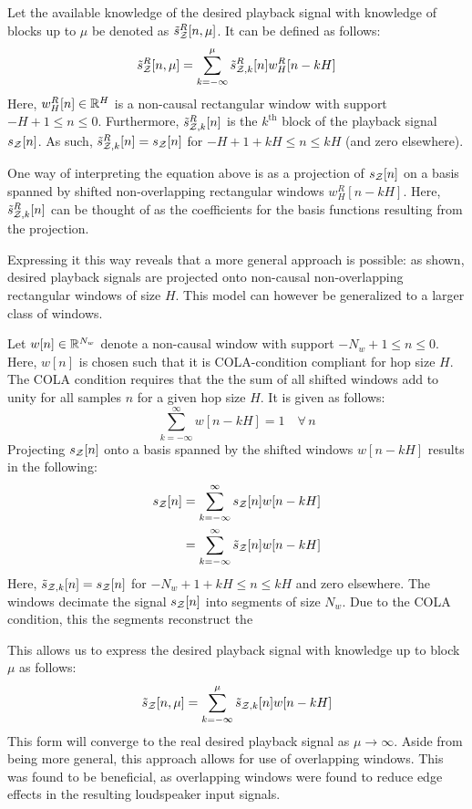 Let the available knowledge of the desired playback signal with knowledge of blocks up to $\mu$ be denoted as $\tilde{s}^R_{\mathcal{Z}}[n, \mu]$.
It can be defined as follows:
\begin{align}
    \tilde{s}^R_{\mathcal{Z}}[n, \mu] = \sum_{k=-\infty}^{\mu} \tilde{s}^R_{\mathcal{Z},k}[n]w^R_H[n - kH]
\end{align}
Here, $w^R_H[n]\in\mathbb{R}^{H}$ is a non-causal rectangular window with support $-H + 1 \leq n \leq 0$. 
Furthermore, $\tilde{s}^R_{\mathcal{Z},k}[n]$ is the $k^\text{th}$ block of the playback signal $s_{\mathcal{Z}}[n]$.
As such, $\tilde{s}^R_{\mathcal{Z},k}[n] = s_{\mathcal{Z}}[n]$ for $-H + 1 + kH \leq n \leq kH$ (and zero elsewhere).  

One way of interpreting the equation above is as a projection of $s_{\mathcal{Z}}[n]$ on a 
basis spanned by shifted non-overlapping rectangular windows $w^R_H[n - kH]$.
Here, $\tilde{s}^R_{\mathcal{Z},k}[n]$ can be thought of as the coefficients for the basis functions resulting from the projection.

Expressing it this way reveals that a more general approach is possible:
as shown, desired playback signals are projected onto non-causal non-overlapping rectangular windows of size $H$.
This model can however be generalized to a larger class of windows.

Let $w[n]\in\mathbb{R}^{N_w}$ denote a non-causal window with support $-N_w + 1 \leq n \leq 0$.
Here, $w[n]$ is chosen such that it is COLA-condition compliant for hop size $H$.
The COLA condition requires that the the sum of all shifted windows add to unity for all samples $n$ for a given hop size $H$. 
It is given as follows:
\begin{equation}
     \sum_{k=-\infty}^{\infty} w[n - kH] = 1 \quad\forall\,n
\end{equation}
Projecting $s_{\mathcal{Z}}[n]$ onto a basis spanned by the shifted windows $w[n - kH]$ results in the following:
\begin{align}
    s_{\mathcal{Z}}[n] &= \sum_{k=-\infty}^{\infty} s_{\mathcal{Z}}[n]w[n - kH] \\
             &= \sum_{k=-\infty}^{\infty} \tilde{s}_{\mathcal{Z}}[n]w[n - kH]
\end{align}
Here, $\tilde{s}_{\mathcal{Z},k}[n] = s_{\mathcal{Z}}[n]$ for $-N_w + 1 + kH \leq n \leq kH$ and zero elsewhere.  
The windows decimate the signal $s_{\mathcal{Z}}[n]$ into segments of size $N_w$. 
Due to the COLA condition, this the segments reconstruct the 

This allows us to express the desired playback signal with knowledge up to block $\mu$ as follows:
\begin{align}
    \tilde{s}_{\mathcal{Z}}[n, \mu] = \sum_{k=-\infty}^{\mu} \tilde{s}_{\mathcal{Z},k}[n]w[n - kH]
\end{align}
This form will converge to the real desired playback signal as $\mu\to\infty$.
Aside from being more general, this approach allows for use of overlapping windows.
This was found to be beneficial, as overlapping windows were found to reduce edge effects in the resulting loudspeaker input signals.

